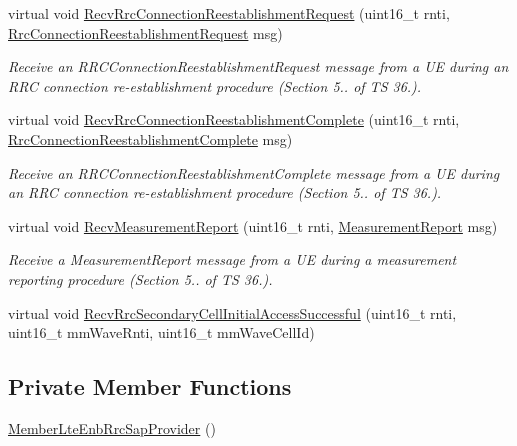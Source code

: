 \begin{DoxyCompactItemize}
virtual void \hyperlink{classns3_1_1MemberLteEnbRrcSapProvider_abef7a62d4d122d94e4dbdbae9bee2699}{Recv\+Rrc\+Connection\+Reestablishment\+Request} (uint16\+\_\+t rnti, \hyperlink{structns3_1_1LteRrcSap_1_1RrcConnectionReestablishmentRequest}{Rrc\+Connection\+Reestablishment\+Request} msg)
\begin{DoxyCompactList}\small\item\em Receive an {\itshape R\+R\+C\+Connection\+Reestablishment\+Request} message from a UE during an R\+RC connection re-\/establishment procedure (Section 5.. of TS 36.). \end{DoxyCompactList}\item 
virtual void \hyperlink{classns3_1_1MemberLteEnbRrcSapProvider_a9eff67c31a68ed81697fda27f93fbe44}{Recv\+Rrc\+Connection\+Reestablishment\+Complete} (uint16\+\_\+t rnti, \hyperlink{structns3_1_1LteRrcSap_1_1RrcConnectionReestablishmentComplete}{Rrc\+Connection\+Reestablishment\+Complete} msg)
\begin{DoxyCompactList}\small\item\em Receive an {\itshape R\+R\+C\+Connection\+Reestablishment\+Complete} message from a UE during an R\+RC connection re-\/establishment procedure (Section 5.. of TS 36.). \end{DoxyCompactList}\item 
virtual void \hyperlink{classns3_1_1MemberLteEnbRrcSapProvider_ac50b3c388418c6631490d871df054a84}{Recv\+Measurement\+Report} (uint16\+\_\+t rnti, \hyperlink{structns3_1_1LteRrcSap_1_1MeasurementReport}{Measurement\+Report} msg)
\begin{DoxyCompactList}\small\item\em Receive a {\itshape Measurement\+Report} message from a UE during a measurement reporting procedure (Section 5.. of TS 36.). \end{DoxyCompactList}\item 
virtual void \hyperlink{classns3_1_1MemberLteEnbRrcSapProvider_ac66ab29e0369cf6698ab343b288e8f80}{Recv\+Rrc\+Secondary\+Cell\+Initial\+Access\+Successful} (uint16\+\_\+t rnti, uint16\+\_\+t mm\+Wave\+Rnti, uint16\+\_\+t mm\+Wave\+Cell\+Id)
\end{DoxyCompactItemize}
\subsection*{Private Member Functions}
\begin{DoxyCompactItemize}
\item 
\hyperlink{classns3_1_1MemberLteEnbRrcSapProvider_a8a588e3bfe6f9b2b7cab6aee1e6a0c5d}{Member\+Lte\+Enb\+Rrc\+Sap\+Provider} ()
\end{DoxyCompactItemize}
